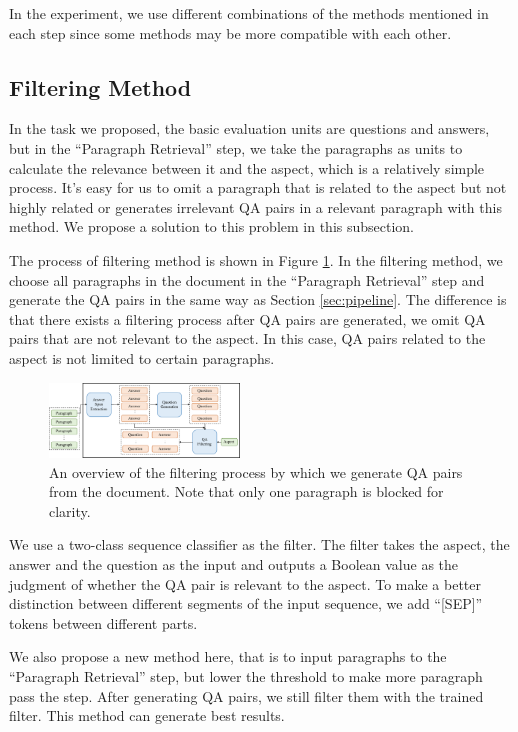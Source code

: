 In the experiment, we use different combinations of the methods mentioned in each step since some methods may be more compatible with each other.

\subsection{Filtering Method}
In the task we proposed, the basic evaluation units are questions and answers, but in the ``Paragraph Retrieval'' step, we take the paragraphs as units to calculate the relevance between it and the aspect, which is a relatively simple process. It's easy for us to omit a paragraph that is related to the aspect but not highly related or generates irrelevant QA pairs in a relevant paragraph with this method. We propose a solution to this problem in this subsection.

The process of filtering method is shown in Figure \ref{fig:filtering}. In the filtering method, we choose all paragraphs in the document in the ``Paragraph Retrieval'' step and generate the QA pairs in the same way as Section \ref{sec:pipeline}. The difference is that there exists a filtering process after QA pairs are generated, we omit QA pairs that are not relevant to the aspect. In this case, QA pairs related to the aspect is not limited to certain paragraphs.

\begin{figure}[th]
    \begin{center}
    \includegraphics[width=0.45\textwidth]{pic/filtering.pdf}
        \caption{\label{fig:filtering} An overview of the filtering process by which we generate QA pairs from the document. Note that only one paragraph is blocked for clarity.}
    \end{center}
\end{figure}

We use a two-class sequence classifier as the filter. The filter takes the aspect, the answer and the question as the input and outputs a Boolean value as the judgment of whether the QA pair is relevant to the aspect. To make a better distinction between different segments of the input sequence, we add ``[SEP]'' tokens between different parts.

We also propose a new method here, that is to input paragraphs to the ``Paragraph Retrieval'' step, but lower the threshold to make more paragraph pass the step. After generating QA pairs, we still filter them with the trained filter. This method can generate best results.

